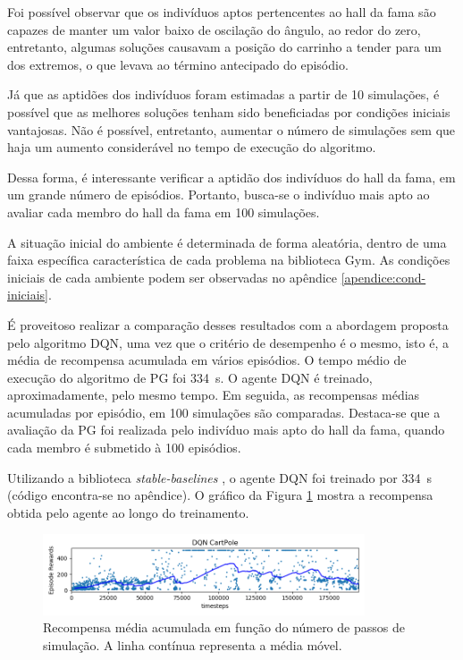 Foi possível observar que os indivíduos aptos pertencentes ao hall da fama são capazes de manter um valor baixo de oscilação do ângulo, ao redor do zero, entretanto, algumas soluções causavam a posição do carrinho a tender para um dos extremos, o que levava ao término antecipado do episódio.

Já que as aptidões dos indivíduos foram estimadas a partir de 10 simulações, é possível que as melhores soluções tenham sido beneficiadas por condições iniciais vantajosas. Não é possível, entretanto, aumentar o número de simulações sem que haja um aumento considerável no tempo de execução do algoritmo.

Dessa forma, é interessante verificar a aptidão dos indivíduos do hall da fama, em um grande número de episódios. Portanto, busca-se o indivíduo mais apto ao avaliar cada membro do hall da fama em 100 simulações.

A situação inicial do ambiente é determinada de forma aleatória, dentro de uma faixa específica característica de cada problema na biblioteca Gym. As condições iniciais de cada ambiente podem ser observadas no apêndice \ref{apendice:cond-iniciais}.

É proveitoso realizar a comparação desses resultados com a abordagem proposta pelo algoritmo DQN, uma vez que o critério de desempenho é o mesmo, isto é, a média de recompensa acumulada em vários episódios. O tempo médio de execução do algoritmo de PG foi \SI{334}{s}. O agente DQN é treinado, aproximadamente, pelo mesmo tempo. Em seguida, as recompensas médias acumuladas por episódio, em 100 simulações são comparadas. Destaca-se que a avaliação da PG foi realizada pelo indivíduo mais apto do hall da fama, quando cada membro é submetido à 100 episódios.

Utilizando a biblioteca \textit{stable-baselines} \cite{stable-baselines}, o agente DQN foi treinado por \SI{334}{s} (código encontra-se no apêndice). O gráfico da Figura \ref{fig:4ec-cartpoledqndiverg} mostra a recompensa obtida pelo agente ao longo do treinamento.

\begin{figure}[H]
	\centering
	\includegraphics[width=0.85\textwidth]{02_desenvolvimento/04_EC_Fig_CartpoleDQNDiverg.png}
	\caption{Recompensa média acumulada em função do número de passos de simulação. A linha contínua representa a média móvel.}
	\label{fig:4ec-cartpoledqndiverg}
\end{figure}

